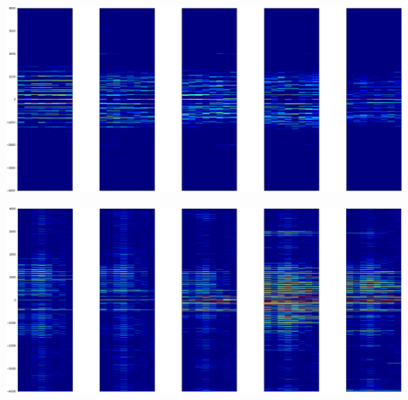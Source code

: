\documentclass[a0,portrait]{a0poster}
\begin{document}
\begin{multicols}{2}

\begin{tcolorbox}[colback=blue!5!white,colframe=blue!75!black,title,title={\section*{Résultats}}]
    \begin{center}
        \includegraphics[width=\textwidth]{./profils_reels.png}
    \end{center}
    \begin{center}
        \includegraphics[width=\textwidth]{./profils_generes.png}
    \end{center}
\end{tcolorbox}
\bigskip



\end{multicols}
\end{document}
